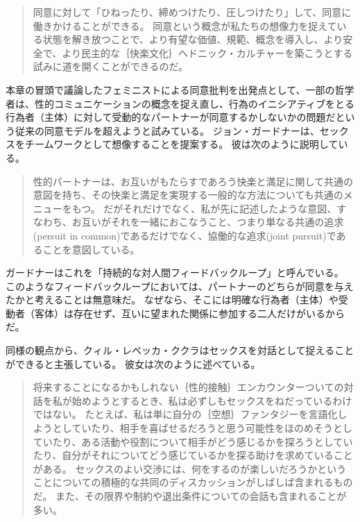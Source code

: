 \documentclass[paper=a4,book,openany]{jlreq}
\newcommand{\ig}[1]{}           %
\begin{document}
\begin{quote}
同意に対して「ひねったり、締めつけたり、圧しつけたり」して、同意に働きかけることができる。
同意という概念が私たちの想像力を捉えている状態を解き放つことで、より有望な価値、規範、概念を導入し、より安全で、より民主的な｛快楽文化｝{ヘドニック・カルチャー}を築こうとする試みに道を開くことができるのだ。
\citep[p.3]{fischel18:screwconsent}
\end{quote}

本章の冒頭で議論したフェミニストによる同意批判を出発点として、一部の哲学者は、性的コミュニケーションの概念を捉え直し、行為のイニシアティブをとる行為者（主体）に対して受動的なパートナーが同意するかしないかの問題だという従来の同意モデルを超えようと試みている。
ジョン・ガードナーは、セックスをチームワークとして想像することを提案する。
彼は次のように説明している。

\begin{quote}
性的パートナーは、お互いがもたらすであろう快楽と満足に関して共通の意図を持ち、その快楽と満足を実現する一般的な方法についても共通のメニューをもつ。
だがそれだけでなく、私が先に記述したような意図、すなわち、お互いがそれを一緒におこなうこと、つまり単なる共通の追求(persuit in common)であるだけでなく、協働的な追求(joint pursuit)であることを意図している。
\citep[p.54]{gardner18:_oppos_rape}
\end{quote}

ガードナー\ig{Gardner}はこれを「持続的な対人間フィードバックループ」と呼んでいる\citep[p.55]{gardner18:_oppos_rape}。
このようなフィードバックループにおいては、パートナーのどちらが同意を与えたかと考えることは無意味だ。
なぜなら、そこには明確な行為者（主体）や受動者（客体）は存在せず、互いに望まれた関係に参加する二人だけがいるからだ。

同様の観点から、クィル・レベッカ・ククラはセックスを対話として捉えることができると主張している。
彼女は次のように述べている。

\begin{quote}
将来することになるかもしれない｛性的接触｝{エンカウンター}ついての対話を私が始めようとするとき、私は必ずしもセックスをねだっているわけではない。
たとえば、私は単に自分の｛空想｝{ファンタジー}を言語化しようとしていたり、相手を喜ばせるだろうと思う可能性をほのめそうとしていたり、ある活動や役割について相手がどう感じるかを探ろうとしていたり、自分がそれについてどう感じているかを探る助けを求めていることがある。
セックスのよい交渉には、何をするのが楽しいだろうかということについての積極的な共同のディスカッションがしばしば含まれるものだ。
また、その限界や制約や退出条件についての会話も含まれることが多い。
\citep[p.76]{kukla18:_thats_what_she_said}
\end{quote}
\end{document}
